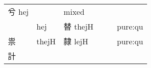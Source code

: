 \documentclass[14pt,a4paper]{scrartcl}
\begin{document}
\begin{longtable}[c]{@{}llllll@{}}
\begin{minipage}[t]{0.14\columnwidth}
兮 hej
\strut\end{minipage} &
\begin{minipage}[t]{0.14\columnwidth}\raggedright\strut
\strut\end{minipage} &
\begin{minipage}[t]{0.14\columnwidth}\raggedright\strut
mixed
\strut\end{minipage}\tabularnewline
\begin{minipage}[t]{0.14\columnwidth}\raggedright\strut
𤾕
\strut\end{minipage} &
\begin{minipage}[t]{0.14\columnwidth}\raggedright\strut
hej
\strut\end{minipage} &
\begin{minipage}[t]{0.14\columnwidth}\raggedright\strut
替 thejH
\strut\end{minipage} &
\begin{minipage}[t]{0.14\columnwidth}\raggedright\strut
\strut\end{minipage} &
\begin{minipage}[t]{0.14\columnwidth}\raggedright\strut
\strut\end{minipage} &
\begin{minipage}[t]{0.14\columnwidth}\raggedright\strut
pure:qu
\strut\end{minipage}\tabularnewline
\begin{minipage}[t]{0.14\columnwidth}\raggedright\strut
祟
\strut\end{minipage} &
\begin{minipage}[t]{0.14\columnwidth}\raggedright\strut
thejH
\strut\end{minipage} &
\begin{minipage}[t]{0.14\columnwidth}\raggedright\strut
隸 lejH
\strut\end{minipage} &
\begin{minipage}[t]{0.14\columnwidth}\raggedright\strut
\strut\end{minipage} &
\begin{minipage}[t]{0.14\columnwidth}\raggedright\strut
\strut\end{minipage} &
\begin{minipage}[t]{0.14\columnwidth}\raggedright\strut
pure:qu
\strut\end{minipage}\tabularnewline
\begin{minipage}[t]{0.14\columnwidth}\raggedright\strut
計
\strut\end{minipage} &
\begin{minipage}[t]{0.14\columnwidth}\raggedright\strut

\end{minipage}
\end{longtable}
\end{document}
